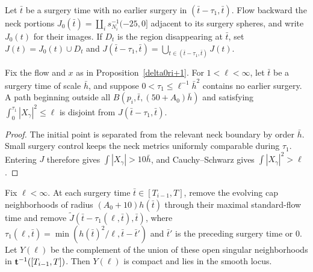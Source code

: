 \begin{definition}
\label{def:disappearing-region-J}
\label{J}
Let $\bar t$ be a surgery time with no earlier surgery in $(\bar t-\tau_1,\bar t)$. Flow backward the neck portions $J_0(\bar t)=\coprod_i s_{N_i}^{-1}(-25,0]$ adjacent to its surgery spheres, and write $J_0(t)$ for their images. If $D_t$ is the region disappearing at $\bar t$, set $J(t)=J_0(t)\cup D_t$ and $J(\bar t-\tau_1,\bar t)=\bigcup_{t\in(\bar t-\tau_1,\bar t)}J(t)$.
\end{definition}

\begin{lemma}
\label{lem:short-energy-avoids-disappearing-region}
\label{15.17}
Fix the flow and $x$ as in Proposition~\ref{delta0ri+1}. For $1<\ell<\infty$, let $\bar t$ be a surgery time of scale $\bar h$, and suppose $0<\tau_1\leq\ell^{-1}\bar h^2$ contains no earlier surgery. A path beginning outside all $B(p_i,\bar t,(50+A_0)\bar h)$ and satisfying $\int_0^{\tau_1}|X_\gamma|^2\leq\ell$ is disjoint from $J(\bar t-\tau_1,\bar t)$.
\end{lemma}
\begin{proof}
\sketch The initial point is separated from the relevant neck boundary by order $\bar h$. Small surgery control keeps the neck metrics uniformly comparable during $\tau_1$. Entering $J$ therefore gives $\int|X_\gamma|>10\bar h$, and Cauchy--Schwarz gives $\int|X_\gamma|^2>\ell$.
\end{proof}

\begin{definition}
\label{def:compact-subset-Y-ell}
Fix $\ell<\infty$. At each surgery time $\bar t\in[T_{i-1},T]$, remove the evolving cap neighborhoods of radius $(A_0+10)h(\bar t)$ through their maximal standard-flow time and remove $\widetilde J(\bar t-\tau_1(\ell,\bar t),\bar t)$, where $\tau_1(\ell,\bar t)=\min(h(\bar t)^2/\ell,\bar t-\bar t')$ and $\bar t'$ is the preceding surgery time or $0$. Let $Y(\ell)$ be the complement of the union of these open singular neighborhoods in ${\bf t}^{-1}([T_{i-1},T])$. Then $Y(\ell)$ is compact and lies in the smooth locus.
\end{definition}

